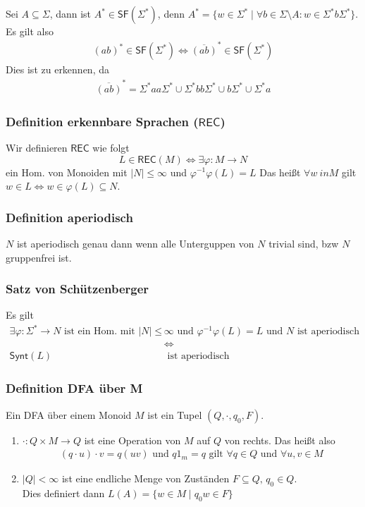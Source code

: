 \documentclass[12pt, german]{article}
\newcommand{\sigstern}{\Sigma^\ast}
\newcommand{\inv}{^{-1}}
\newcommand{\rec}{\mathsf{REC}}
\newcommand{\starfree}{\mathsf{SF}}
\newcommand{\synt}{\mathsf{Synt}}
\begin{document}
	Sei $A\subseteq \Sigma$, dann ist $A^\ast \in \starfree(\sigstern)$, denn $A^\ast = \{ w \in \sigstern \mid \forall b \in \Sigma \setminus A : w \in \sigstern b\sigstern\}$. Es gilt also 
	\begin{align*}
		(ab)^\ast \in \starfree(\sigstern) \iff \overline{(ab)}^\ast\in \starfree(\sigstern)
	\end{align*}
	Dies ist zu erkennen, da  
	\begin{align*}
		\overline{(ab)}^\ast = \sigstern aa \sigstern \cup \sigstern bb \sigstern \cup b\sigstern \cup \sigstern a
	\end{align*}

 

\subsubsection{Definition erkennbare Sprachen ($\rec$)}
	Wir definieren $\rec$ wie folgt  $$L \in \rec(M) \iff \exists \varphi : M \to N$$ ein Hom. von Monoiden mit $|N| \leq \infty$ und $\varphi\inv\varphi(L) = L$
	Das heißt $\forall w \ in M$ gilt $w\in L \iff w \in \varphi(L) \subseteq N$.

\subsubsection{Definition aperiodisch}
	$N$ ist aperiodisch genau dann wenn alle Unterguppen von $N$ trivial sind, bzw $N$ gruppenfrei ist.
 
	
\subsubsection{Satz von Schützenberger}
	Es gilt 
	\begin{align*}
		\exists \varphi: \sigstern \to N \text{ ist ein Hom. mit } |N| \leq &\infty \text{ und } \varphi\inv\varphi(L) = L \text{ und $N$ ist aperiodisch} \\ 
		&\iff \\
		\synt(L) &\text{ ist aperiodisch}
	\end{align*}
	
\subsubsection{Definition DFA über M}
	Ein DFA über einem Monoid $M$ ist ein Tupel $(Q, \cdot, q_0, F)$. 
	\begin{enumerate}[label=\arabic*)]
		\item $\cdot: Q \times M \to Q$ ist eine Operation von $M$ auf $Q$ von rechts. Das heißt also
			\begin{align*}
				(q \cdot u) \cdot v = q(uv) \text{ und } q1_m = q \text{ gilt } \forall q \in Q \text{ und } \forall u,v \in M
			\end{align*}
		\item $|Q| < \infty$ ist eine endliche Menge von Zuständen $F\subseteq Q,  \, q_0 \in Q$. \\
		Dies definiert dann $L(A) = \{w \in M \mid q_0w \in F\}$
	\end{enumerate}
\end{document}
